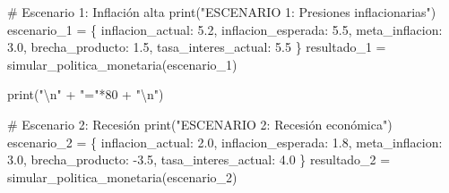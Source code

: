\documentclass[
  doc,
  floatsintext,
  longtable,
  a4paper,
  nolmodern,
  notxfonts,
  notimes,
  12pt,
  colorlinks=true,linkcolor=blue,citecolor=blue,urlcolor=blue]{apa7}
\newenvironment{Shaded}{\begin{snugshade}}{\end{snugshade}}
\newcommand{\BuiltInTok}[1]{\textcolor[rgb]{0.00,0.23,0.31}{#1}}
\newcommand{\CharTok}[1]{\textcolor[rgb]{0.13,0.47,0.30}{#1}}
\newcommand{\CommentTok}[1]{\textcolor[rgb]{0.37,0.37,0.37}{#1}}
\newcommand{\DecValTok}[1]{\textcolor[rgb]{0.68,0.00,0.00}{#1}}
\newcommand{\FloatTok}[1]{\textcolor[rgb]{0.68,0.00,0.00}{#1}}
\newcommand{\NormalTok}[1]{\textcolor[rgb]{0.00,0.23,0.31}{#1}}
\newcommand{\OperatorTok}[1]{\textcolor[rgb]{0.37,0.37,0.37}{#1}}
\newcommand{\StringTok}[1]{\textcolor[rgb]{0.13,0.47,0.30}{#1}}
\begin{document}
\begin{Shaded}
\begin{Highlighting}[]
\CommentTok{\# Escenario 1: Inflación alta}
\BuiltInTok{print}\NormalTok{(}\StringTok{"ESCENARIO 1: Presiones inflacionarias"}\NormalTok{)}
\NormalTok{escenario\_1 }\OperatorTok{=}\NormalTok{ \{}
    \StringTok{\textquotesingle{}inflacion\_actual\textquotesingle{}}\NormalTok{: }\FloatTok{5.2}\NormalTok{,}
    \StringTok{\textquotesingle{}inflacion\_esperada\textquotesingle{}}\NormalTok{: }\FloatTok{5.5}\NormalTok{,}
    \StringTok{\textquotesingle{}meta\_inflacion\textquotesingle{}}\NormalTok{: }\FloatTok{3.0}\NormalTok{,}
    \StringTok{\textquotesingle{}brecha\_producto\textquotesingle{}}\NormalTok{: }\FloatTok{1.5}\NormalTok{,}
    \StringTok{\textquotesingle{}tasa\_interes\_actual\textquotesingle{}}\NormalTok{: }\FloatTok{5.5}
\NormalTok{\}}
\NormalTok{resultado\_1 }\OperatorTok{=}\NormalTok{ simular\_politica\_monetaria(escenario\_1)}

\BuiltInTok{print}\NormalTok{(}\StringTok{"}\CharTok{\textbackslash{}n}\StringTok{"} \OperatorTok{+} \StringTok{"="}\OperatorTok{*}\DecValTok{80} \OperatorTok{+} \StringTok{"}\CharTok{\textbackslash{}n}\StringTok{"}\NormalTok{)}

\CommentTok{\# Escenario 2: Recesión}
\BuiltInTok{print}\NormalTok{(}\StringTok{"ESCENARIO 2: Recesión económica"}\NormalTok{)}
\NormalTok{escenario\_2 }\OperatorTok{=}\NormalTok{ \{}
    \StringTok{\textquotesingle{}inflacion\_actual\textquotesingle{}}\NormalTok{: }\FloatTok{2.0}\NormalTok{,}
    \StringTok{\textquotesingle{}inflacion\_esperada\textquotesingle{}}\NormalTok{: }\FloatTok{1.8}\NormalTok{,}
    \StringTok{\textquotesingle{}meta\_inflacion\textquotesingle{}}\NormalTok{: }\FloatTok{3.0}\NormalTok{,}
    \StringTok{\textquotesingle{}brecha\_producto\textquotesingle{}}\NormalTok{: }\OperatorTok{{-}}\FloatTok{3.5}\NormalTok{,}
    \StringTok{\textquotesingle{}tasa\_interes\_actual\textquotesingle{}}\NormalTok{: }\FloatTok{4.0}
\NormalTok{\}}
\NormalTok{resultado\_2 }\OperatorTok{=}\NormalTok{ simular\_politica\_monetaria(escenario\_2)}
\end{Highlighting}
\end{Shaded}
\end{document}
